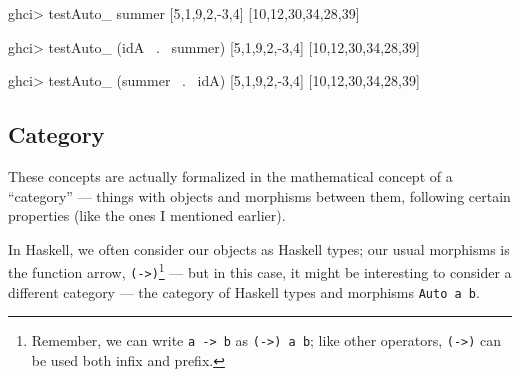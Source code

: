 \documentclass[]{article}
\newenvironment{Shaded}{}{}
\newcommand{\DecValTok}[1]{\textcolor[rgb]{0.25,0.63,0.44}{#1}}
\newcommand{\FunctionTok}[1]{\textcolor[rgb]{0.02,0.16,0.49}{#1}}
\newcommand{\NormalTok}[1]{#1}
\begin{document}
\begin{Shaded}
\begin{Highlighting}[]
\NormalTok{ghci}\FunctionTok{>}\NormalTok{ testAuto_ summer [}\DecValTok{5}\NormalTok{,}\DecValTok{1}\NormalTok{,}\DecValTok{9}\NormalTok{,}\DecValTok{2}\NormalTok{,}\FunctionTok{-}\DecValTok{3}\NormalTok{,}\DecValTok{4}\NormalTok{]}
\NormalTok{[}\DecValTok{10}\NormalTok{,}\DecValTok{12}\NormalTok{,}\DecValTok{30}\NormalTok{,}\DecValTok{34}\NormalTok{,}\DecValTok{28}\NormalTok{,}\DecValTok{39}\NormalTok{]}

\NormalTok{ghci}\FunctionTok{>}\NormalTok{ testAuto_ (idA }\FunctionTok{~.~}\NormalTok{ summer) [}\DecValTok{5}\NormalTok{,}\DecValTok{1}\NormalTok{,}\DecValTok{9}\NormalTok{,}\DecValTok{2}\NormalTok{,}\FunctionTok{-}\DecValTok{3}\NormalTok{,}\DecValTok{4}\NormalTok{]}
\NormalTok{[}\DecValTok{10}\NormalTok{,}\DecValTok{12}\NormalTok{,}\DecValTok{30}\NormalTok{,}\DecValTok{34}\NormalTok{,}\DecValTok{28}\NormalTok{,}\DecValTok{39}\NormalTok{]}

\NormalTok{ghci}\FunctionTok{>}\NormalTok{ testAuto_ (summer }\FunctionTok{~.~}\NormalTok{ idA) [}\DecValTok{5}\NormalTok{,}\DecValTok{1}\NormalTok{,}\DecValTok{9}\NormalTok{,}\DecValTok{2}\NormalTok{,}\FunctionTok{-}\DecValTok{3}\NormalTok{,}\DecValTok{4}\NormalTok{]}
\NormalTok{[}\DecValTok{10}\NormalTok{,}\DecValTok{12}\NormalTok{,}\DecValTok{30}\NormalTok{,}\DecValTok{34}\NormalTok{,}\DecValTok{28}\NormalTok{,}\DecValTok{39}\NormalTok{]}
\end{Highlighting}
\end{Shaded}

\hypertarget{category}{%
\subsection{Category}\label{category}}

These concepts are actually formalized in the mathematical concept of a
``category'' --- things with objects and morphisms between them, following
certain properties (like the ones I mentioned earlier).

In Haskell, we often consider our objects as Haskell types; our usual morphisms
is the function arrow, \texttt{(-\textgreater{})}\footnote{Remember, we can
  write \texttt{a\ -\textgreater{}\ b} as \texttt{(-\textgreater{})\ a\ b}; like
  other operators, \texttt{(-\textgreater{})} can be used both infix and prefix.}
--- but in this case, it might be interesting to consider a different category
--- the category of Haskell types and morphisms \texttt{Auto\ a\ b}.
\end{document}
